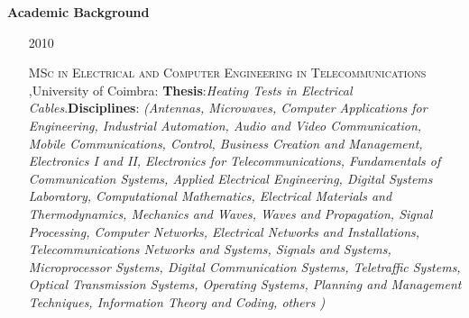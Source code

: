 \documentclass[10pt,a4paper,oneside]{article}
\newlength{\datewidth}
\newlength{\textindent}
\begin{document}
	\vspace{5mm}	
	\textbf{\hspace{\textindent}Academic Background}
	\begin{itemize}

		
	\item[\hspace{\datewidth}\scriptsize 2010] \parbox[t]{\dimexpr\linewidth-\datewidth-\textindent}{\textsc{MSc in Electrical and Computer Engineering in Telecommunications} ,University of Coimbra: \textbf{Thesis}:\textit{Heating Tests in Electrical Cables}.\textbf{Disciplines}: \textit{(Antennas, Microwaves, Computer Applications for Engineering, Industrial Automation, Audio and Video Communication, Mobile Communications, Control, Business Creation and Management, Electronics I and II, Electronics for Telecommunications, Fundamentals of Communication Systems, Applied Electrical Engineering, Digital Systems Laboratory, Computational Mathematics, Electrical Materials and Thermodynamics, Mechanics and Waves, Waves and Propagation, Signal Processing, Computer Networks, Electrical Networks and Installations, Telecommunications Networks and Systems, Signals and Systems, Microprocessor Systems, Digital Communication Systems, Teletraffic Systems, Optical Transmission Systems, Operating Systems, Planning and Management Techniques, Information Theory and Coding, others  )}}
		
		

\end{itemize}
\end{document}
